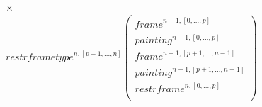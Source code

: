 \documentclass{article}
\newcommand{\myframe}{\mathit{frame}}
\newcommand{\painting}{\mathit{painting}}
\newcommand{\restrframe}{\mathit{restrframe}}
\newcommand{\restrframetype}{\mathit{restrframetype}}
\begin{document}
\begin{itemize}
$$\begin{array}{llcl}
\begin{array}{l}
                                \times \\
                                \restrframetype^{n,[p+1,...,n]}
                                \left(\begin{array}{l}
                                    \myframe^{n-1,[0,...,p]}  \\
                                    \painting^{n-1,[0,...,p]} \\
                                    \myframe^{n-1,[p+1,...,n-1]}  \\
                                    \painting^{n-1,[p+1,...,n-1]} \\
                                    \restrframe^{n,[0,...,p]} \\
                                  \end{array}\right)
                                \end{array}
          \end{array}
        $$



\end{itemize}
\end{document}
